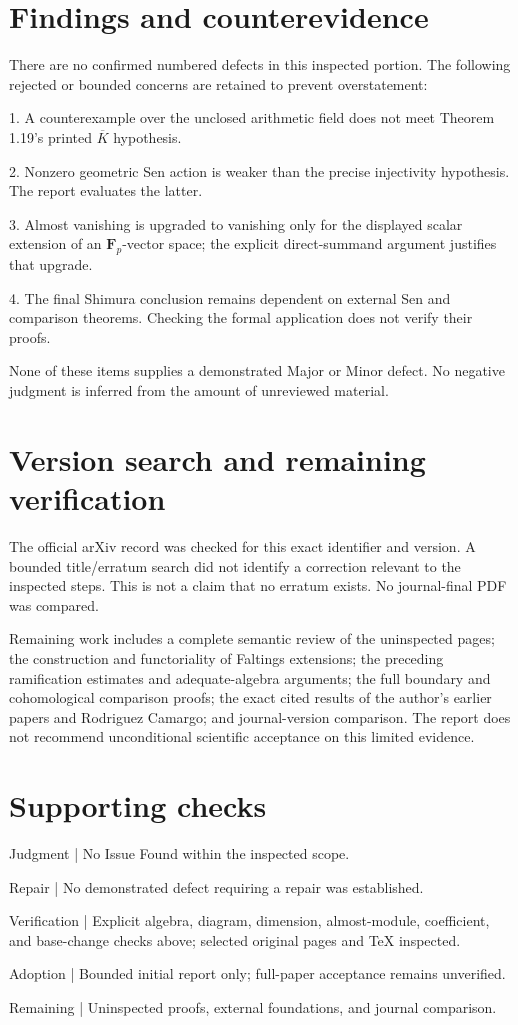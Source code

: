 \documentclass[10pt]{article}
\begin{document}
\section*{Findings and counterevidence}
There are no confirmed numbered defects in this inspected portion. The following rejected or bounded concerns are retained to prevent overstatement:\par
1. A counterexample over the unclosed arithmetic field does not meet Theorem 1.19’s printed \(\overline K\) hypothesis.\par
2. Nonzero geometric Sen action is weaker than the precise injectivity hypothesis. The report evaluates the latter.\par
3. Almost vanishing is upgraded to vanishing only for the displayed scalar extension of an \(\mathbf F_p\)-vector space; the explicit direct-summand argument justifies that upgrade.\par
4. The final Shimura conclusion remains dependent on external Sen and comparison theorems. Checking the formal application does not verify their proofs.\par
None of these items supplies a demonstrated Major or Minor defect. No negative judgment is inferred from the amount of unreviewed material.\par
\section*{Version search and remaining verification}
The official arXiv record was checked for this exact identifier and version. A bounded title/erratum search did not identify a correction relevant to the inspected steps. This is not a claim that no erratum exists. No journal-final PDF was compared.\par
Remaining work includes a complete semantic review of the uninspected pages; the construction and functoriality of Faltings extensions; the preceding ramification estimates and adequate-algebra arguments; the full boundary and cohomological comparison proofs; the exact cited results of the author’s earlier papers and Rodriguez Camargo; and journal-version comparison. The report does not recommend unconditional scientific acceptance on this limited evidence.\par
\section*{Supporting checks}
Judgment | No Issue Found within the inspected scope.\par
Repair | No demonstrated defect requiring a repair was established.\par
Verification | Explicit algebra, diagram, dimension, almost-module, coefficient, and base-change checks above; selected original pages and TeX inspected.\par
Adoption | Bounded initial report only; full-paper acceptance remains unverified.\par
Remaining | Uninspected proofs, external foundations, and journal comparison.\par
\end{document}

